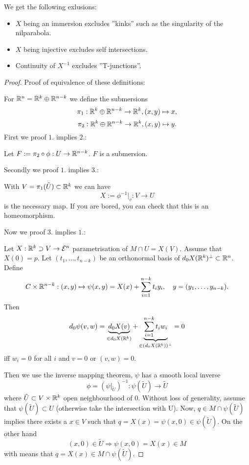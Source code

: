 \begin{remark} We get the following exlusions:	
	\begin{itemize}
		\item $X$ being an immersion excludes ''kinks'' such as the singularity of the nilparabola.
		\item $X$ being injective excludes self intersections.
		\item Continuity of $X^{-1}$ excludes ''T-junctions''.
	\end{itemize}
\end{remark}

\begin{proof}
	Proof of equivalence of these definitions:
	
	For $\mathbb R^n = \mathbb R^k \oplus \mathbb R^{n-k}$ we define the submersions
		\[ \pi_1: \mathbb R^k \oplus \mathbb R^{n-k} \to \mathbb R^k, (x,y) \mapsto x, \]
		\[ \pi_2: \mathbb R^k \oplus \mathbb R^{n-k} \to \mathbb R^k, (x,y) \mapsto y. \]
	First we proof $1.$ implies $2.$:
	
	Let $F:= \pi_2 \circ \phi: U \to \mathbb R^{n-k}$. $F$ is a submersion.
	
	Secondly we proof $1.$ implies $3.$:
	
	With $V= \pi_1(\tilde U) \subset \mathbb R^k$ we can have
		\[ X:= \phi^{-1}\big|_v: V \to U \]
	is the necessary map.
	If you are bored, you can check that this is an homeomorphism.
	
	Now we proof $3.$ implies $1.$:
	
	Let $X: \mathbb R^k \supset V \to \mathcal E^n$ parametrisation of $M \cap U = X(V)$. Assume that $X(0)= p$. Let $(t_1, \ldots,t_{n-k})$ be an orthonormal basis of $d_0X(\mathbb R^k)^\perp \subset \mathbb R^n$. Define
		\[ C \times \mathbb R^{n-k}: (x,y) \mapsto \psi(x,y)= X(x)+ \sum_{i=1}^{n-k} t_iy_i, \quad y=(y_1,\ldots,y_{n-k}). \]
	Then 
		\[ d_0\psi(v,w) = \underbrace{d_0X(v)}_{\in d_0X(\mathbb R^k)} + \underbrace{\sum_{i=1}^{n-k} t_i w_i}_{\in (d_0X(\mathbb R^k))^\perp} = 0 \]
	iff $w_i=0$ for all $i$ and $v=0$ or $(v,w)=0$. 
	
	Then we use the inverse mapping theorem, $\psi$ has a smooth local inverse
		\[ \phi=(\psi\big|_{\tilde U})^{-1}: \psi(\tilde U) \to \tilde U \]
	where $\tilde U \subset V \times \mathbb R^k$ open neighbourhood of $0$. Without loss of generality, assume that $\psi(\tilde U) \subset U$ (otherwise take the intersection with U).
	Now, $q \in M \cap \psi(\tilde U)$ implies there exists a $x \in V$ such that $q= X(x)= \psi(x,0) \in \psi(\tilde U)$. On the other hand 
		\[ (x,0) \in \tilde U \Rightarrow \psi(x,0) = X(x) \in M \]
	with means that $q=X(x) \in M \cap \psi(\tilde U)$.
	

\end{proof}
